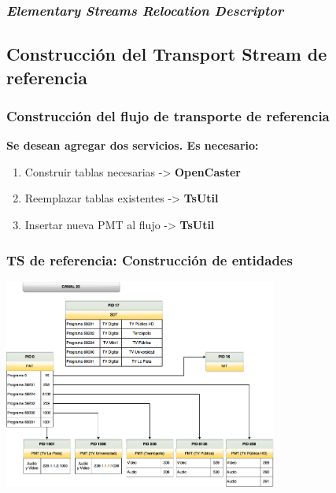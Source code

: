 \documentclass[a4paper,11pt]{beamer}
\begin{document}
		\begin{frame}
			\frametitle{\emph{Elementary Streams Relocation Descriptor}}
		\end{frame}

	\subsection{Construcción del Transport Stream de referencia}
		\begin{frame}
			\frametitle{Construcción del flujo de transporte de referencia}
			\textbf{Se desean agregar dos servicios. Es necesario:}\\
			\begin{enumerate}
				\item Construir tablas necesarias -> \textbf{OpenCaster}
				\item Reemplazar tablas existentes -> \textbf{TsUtil}
				\item Insertar nueva PMT al flujo -> \textbf{TsUtil}
			\end{enumerate}
		\end{frame}

		\begin{frame}
			\frametitle{TS de referencia: Construcción de entidades}
			\begin{center}
				\includegraphics[width=9cm]{canal_23_extended_tables.png}
			\end{center}	
		\end{frame}
\end{document}
